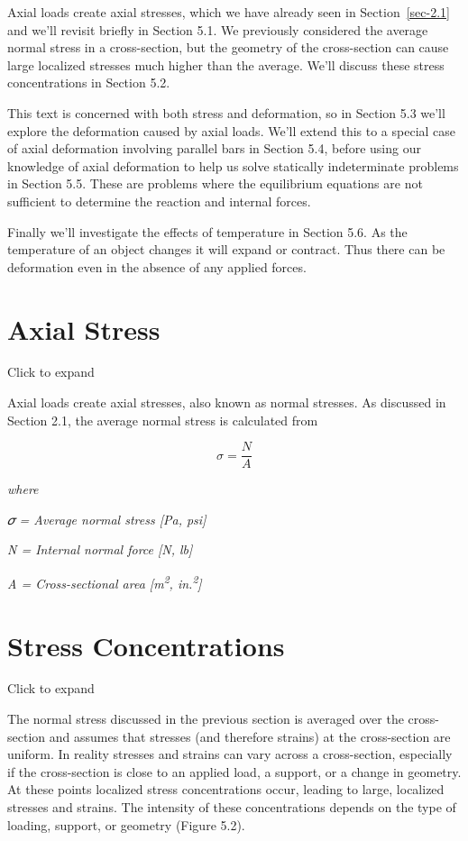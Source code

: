 \documentclass[
  letterpaper,
  DIV=11,
  numbers=noendperiod]{scrreprt}
\begin{document}
Axial loads create axial stresses, which we have already seen in
Section~\ref{sec-2.1} and we'll revisit briefly in Section 5.1. We
previously considered the average normal stress in a cross-section, but
the geometry of the cross-section can cause large localized stresses
much higher than the average. We'll discuss these stress concentrations
in Section 5.2.

This text is concerned with both stress and deformation, so in Section
5.3 we'll explore the deformation caused by axial loads. We'll extend
this to a special case of axial deformation involving parallel bars in
Section 5.4, before using our knowledge of axial deformation to help us
solve statically indeterminate problems in Section 5.5. These are
problems where the equilibrium equations are not sufficient to determine
the reaction and internal forces.

Finally we'll investigate the effects of temperature in Section 5.6. As
the temperature of an object changes it will expand or contract. Thus
there can be deformation even in the absence of any applied forces.

\section{Axial Stress}\label{sec-5.1}

Click to expand

Axial loads create axial stresses, also known as normal stresses. As
discussed in Section 2.1, the average normal stress is calculated from

\[
\sigma=\frac{N}{A}\]

\emph{where}

\emph{𝜎 = Average normal stress {[}Pa, psi{]}}

\emph{N = Internal normal force {[}N, lb{]}}

\emph{A = Cross-sectional area {[}m\textsuperscript{2},
in.\textsuperscript{2}{]}}

\section{Stress Concentrations}\label{sec-5.2}

Click to expand

The normal stress discussed in the previous section is averaged over the
cross-section and assumes that stresses (and therefore strains) at the
cross-section are uniform. In reality stresses and strains can vary
across a cross-section, especially if the cross-section is close to an
applied load, a support, or a change in geometry. At these points
localized stress concentrations occur, leading to large, localized
stresses and strains. The intensity of these concentrations depends on
the type of loading, support, or geometry (Figure 5.2).
\end{document}
